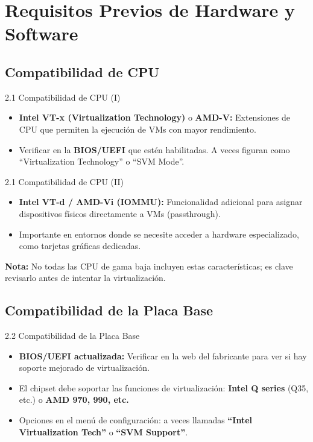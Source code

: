 \documentclass{beamer}
\begin{document}
\section{Requisitos Previos de Hardware y Software}

\subsection{Compatibilidad de CPU}
\begin{frame}{2.1 Compatibilidad de CPU (I)}
	\begin{itemize}
		\item \textbf{Intel VT-x (Virtualization Technology)} o \textbf{AMD-V:} Extensiones de CPU que permiten la ejecución de VMs con mayor rendimiento.
		\item Verificar en la \textbf{BIOS/UEFI} que estén habilitadas. A veces figuran como “Virtualization Technology” o “SVM Mode”.
	\end{itemize}
\end{frame}

\begin{frame}{2.1 Compatibilidad de CPU (II)}
	\begin{itemize}
		\item \textbf{Intel VT-d / AMD-Vi (IOMMU):} Funcionalidad adicional para asignar dispositivos físicos directamente a VMs (passthrough).
		\item Importante en entornos donde se necesite acceder a hardware especializado, como tarjetas gráficas dedicadas.
	\end{itemize}
	\textbf{Nota:} No todas las CPU de gama baja incluyen estas características; es clave revisarlo antes de intentar la virtualización.
\end{frame}

\subsection{Compatibilidad de la Placa Base}
\begin{frame}{2.2 Compatibilidad de la Placa Base}
	\begin{itemize}
		\item \textbf{BIOS/UEFI actualizada:} Verificar en la web del fabricante para ver si hay soporte mejorado de virtualización.
		\item El chipset debe soportar las funciones de virtualización: \textbf{Intel Q series} (Q35, etc.) o \textbf{AMD 970, 990, etc.}
		\item Opciones en el menú de configuración: a veces llamadas \textbf{“Intel Virtualization Tech”} o \textbf{“SVM Support”}.
	\end{itemize}
\end{frame}
\end{document}
